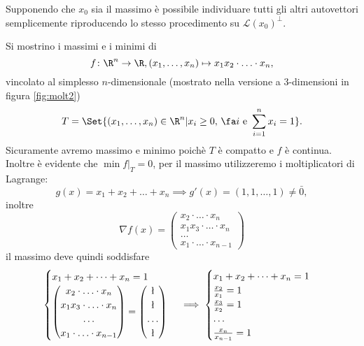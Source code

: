 \begin{oss}
	Supponendo che \(x_0\) sia il massimo è possibile individuare tutti gli altri autovettori semplicemente riproducendo lo stesso procedimento su \(\mathcal{L}(x_0)^\perp\).
\end{oss}

\begin{ese}
	Si mostrino i massimi e i minimi di
	\[
		f\colon \R^n\to\R,(x_1,\dots,x_n)\mapsto x_1 x_2\cdot\ldots\cdot x_n,
	\]
	vincolato al simplesso \(n\)-dimensionale (mostrato nella versione a \(3\)-dimensioni in figura \ref{fig:molt2})
	\[
		T=\Set{(x_1,\dots,x_n)\in\R^n | x_i\ge 0,\,\fa i\text{ e }\sum_{i=1}^n x_i=1}.
	\]
	Sicuramente avremo massimo e minimo poichè \(T\) è compatto e \(f\) è continua.
	Inoltre è evidente che \(\min f|_T=0\), per il massimo utilizzeremo i moltiplicatori di Lagrange:
	\[
		g(x)=x_1+x_2+\dots+x_n\implies g'(x)=(1,1,\dots,1)\neq\bar{0},
	\]
	inoltre
	\[
		\nabla f(x)=
		\begin{pmatrix}
			x_2\cdot\ldots\cdot x_n     \\
			x_1 x_3\cdot\ldots\cdot x_n \\
			\dots                       \\
			x_1\cdot\ldots\cdot x_{n-1}
		\end{pmatrix}
	\]
	il massimo deve quindi soddisfare
	\[
		\begin{cases}
			x_1+x_2+\dots+x_n=1 \\
			\begin{pmatrix}
				x_2\cdot\ldots\cdot x_n     \\
				x_1 x_3\cdot\ldots\cdot x_n \\
				\dots                       \\
				x_1\cdot\ldots\cdot x_{n-1}
			\end{pmatrix}
			=
			\begin{pmatrix}
				\l    \\
				\l    \\
				\dots \\
				\l
			\end{pmatrix}
		\end{cases}
		\implies
		\begin{cases}
			x_1+x_2+\dots+x_n=1 \\
			\frac{x_2}{x_1}=1   \\
			\frac{x_3}{x_2}=1   \\
			\dots               \\
			\frac{x_n}{x_{n-1}}=1
		\end{cases}
\]
\end{ese}
